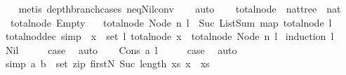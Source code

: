\begin{isabellebody}
%
\isadelimproof
\ \ %
\endisadelimproof
%
\isatagproof
{}\isamarkupfalse%
\ {\isacharparenleft}metis\ depth{\isacharunderscore}branch{\isachardot}cases\ neq{\isacharunderscore}Nil{\isacharunderscore}conv{\isacharparenright}\isanewline
\ \ \isamarkupfalse%
\ auto%
\endisatagproof
{\isafoldproof}%
%
\isadelimproof
\isanewline
%
\endisadelimproof
\ \ \isanewline
{}\isamarkupfalse%
\ total{\isacharunderscore}node\ {\isacharcolon}{\isacharcolon}\ {\isachardoublequoteopen}nattree\ {\isasymRightarrow}\ nat{\isachardoublequoteclose}\ \isanewline
\ \ {\isachardoublequoteopen}total{\isacharunderscore}node\ Empty\ {\isacharequal}\ {}{\isachardoublequoteclose}\isanewline
{\isacharbar}\ {\isachardoublequoteopen}total{\isacharunderscore}node\ {\isacharparenleft}Node\ n\ l{\isacharparenright}\ {\isacharequal}\ Suc\ {\isacharparenleft}ListSum\ {\isacharparenleft}map\ total{\isacharunderscore}node\ l{\isacharparenright}{\isacharparenright}{\isachardoublequoteclose}\isanewline
\isanewline
{}\isamarkupfalse%
\ total{\isacharunderscore}nod{\isacharunderscore}dec\ {\isacharbrackleft}simp{\isacharbrackright}\ {\isacharcolon}\ {\isachardoublequoteopen}{\isasymforall}x\ {\isasymin}\ set\ l{\isachardot}\ total{\isacharunderscore}node\ x\ {\isacharless}\ total{\isacharunderscore}node\ {\isacharparenleft}Node\ n\ l{\isacharparenright}{\isachardoublequoteclose}\isanewline
%
\isadelimproof
%
\endisadelimproof
%
\isatagproof
{}\isamarkupfalse%
\ {\isacharparenleft}induction\ l{\isacharparenright}\isanewline
\ \ \isamarkupfalse%
\ Nil\isanewline
\ \ \isamarkupfalse%
\ \isamarkupfalse%
\ {\isacharquery}case\ \isamarkupfalse%
\ auto\isanewline
{}\isamarkupfalse%
\isanewline
\ \ \isamarkupfalse%
\ {\isacharparenleft}Cons\ a\ l{\isacharparenright}\isanewline
\ \ \isamarkupfalse%
\ \isamarkupfalse%
\ {\isacharquery}case\ \isamarkupfalse%
\ auto\isanewline
{}\isamarkupfalse%
%
\endisatagproof
{\isafoldproof}%
%
\isadelimproof
\isanewline
%
\endisadelimproof
\ \ \ \ \isanewline
{}\isamarkupfalse%
\ {\isacharbrackleft}simp{\isacharbrackright}{\isacharcolon}\ {\isachardoublequoteopen}{\isacharparenleft}a{\isacharcomma}\ b{\isacharparenright}\ {\isasymin}\ set\ {\isacharparenleft}zip\ {\isacharparenleft}firstN\ {\isacharparenleft}Suc\ {\isacharparenleft}length\ xs{\isacharparenright}{\isacharparenright}{\isacharparenright}\ {\isacharparenleft}x\ {\isacharhash}\ xs{\isacharparenright}{\isacharparenright}\ {\isasymLongrightarrow}\isanewline

\end{isabellebody}
